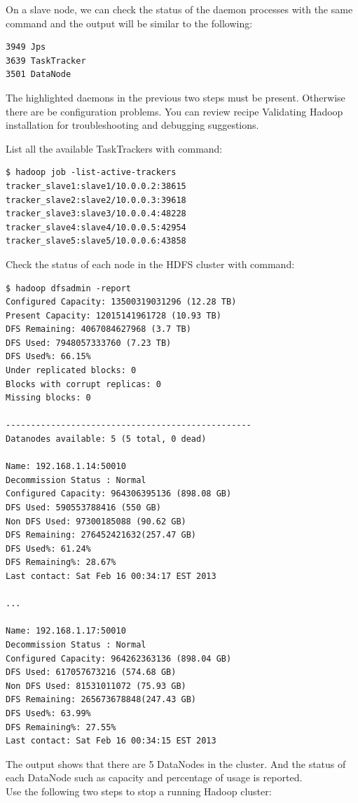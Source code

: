 On a slave node, we can check the status of the daemon processes with the same command and the output will be similar to the following:
\begin{verbatim}
3949 Jps
3639 TaskTracker
3501 DataNode
\end{verbatim}

The highlighted daemons in the previous two steps must be present. Otherwise there are be configuration problems. You can review recipe Validating Hadoop installation for troubleshooting and debugging suggestions.

List all the available TaskTrackers with command:
\lstset{style=bashstyle}
\begin{lstlisting}
$ hadoop job -list-active-trackers
tracker_slave1:slave1/10.0.0.2:38615
tracker_slave2:slave2/10.0.0.3:39618
tracker_slave3:slave3/10.0.0.4:48228
tracker_slave4:slave4/10.0.0.5:42954
tracker_slave5:slave5/10.0.0.6:43858
\end{lstlisting}

Check the status of each node in the HDFS cluster with command:
\lstset{style=bashstyle}
\begin{lstlisting}
$ hadoop dfsadmin -report
Configured Capacity: 13500319031296 (12.28 TB)
Present Capacity: 12015141961728 (10.93 TB)
DFS Remaining: 4067084627968 (3.7 TB)
DFS Used: 7948057333760 (7.23 TB)
DFS Used%: 66.15%
Under replicated blocks: 0
Blocks with corrupt replicas: 0
Missing blocks: 0

-------------------------------------------------
Datanodes available: 5 (5 total, 0 dead)

Name: 192.168.1.14:50010
Decommission Status : Normal
Configured Capacity: 964306395136 (898.08 GB)
DFS Used: 590553788416 (550 GB)
Non DFS Used: 97300185088 (90.62 GB)
DFS Remaining: 276452421632(257.47 GB)
DFS Used%: 61.24%
DFS Remaining%: 28.67%
Last contact: Sat Feb 16 00:34:17 EST 2013

...

Name: 192.168.1.17:50010
Decommission Status : Normal
Configured Capacity: 964262363136 (898.04 GB)
DFS Used: 617057673216 (574.68 GB)
Non DFS Used: 81531011072 (75.93 GB)
DFS Remaining: 265673678848(247.43 GB)
DFS Used%: 63.99%
DFS Remaining%: 27.55%
Last contact: Sat Feb 16 00:34:15 EST 2013
\end{lstlisting}

The output shows that there are 5 DataNodes in the cluster. And the status of each DataNode such as capacity and percentage of usage is reported. \\
Use the following two steps to stop a running Hadoop cluster:

